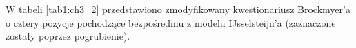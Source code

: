 \newpage

W tabeli \ref{tab1:ch3_2} przedstawiono zmodyfikowany kwestionariusz Brockmyer'a\cite{development_of_game}
o cztery pozycje pochodzące bezpośredniu z modelu IJsselsteijn'a\cite{game_exp_quest}
(zaznaczone zostały poprzez pogrubienie). 